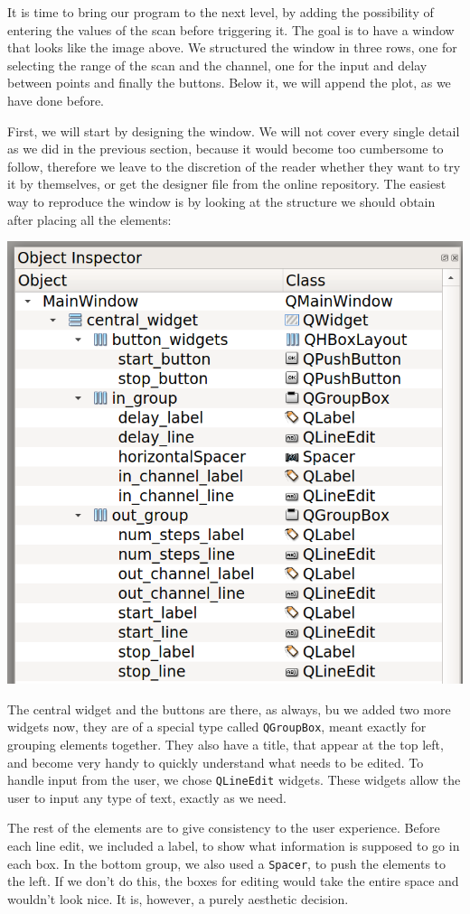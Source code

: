 It is time to bring our program to the next level, by adding the possibility of entering the values of the scan before triggering it. The goal is to have a window that looks like the image above. We structured the window in three rows, one for selecting the range of the scan and the channel, one for the input and delay between points and finally the buttons. Below it, we will append the plot, as we have done before.

First, we will start by designing the window. We will not cover every single detail as we did in the previous section, because it would become too cumbersome to follow, therefore we leave to the discretion of the reader whether they want to try it by themselves, or get the designer file from the online repository. The easiest way to reproduce the window is by looking at the structure we should obtain after placing all the elements:

\begin{center}
    \includegraphics[width=.5\textwidth]{images/Chapter_09/09_final_window_structure.png}
\end{center}

The central widget and the buttons are there, as always, bu we added two more widgets now, they are of a special type called \texttt{QGroupBox}, meant exactly for grouping elements together. They also have a title, that appear at the top left, and become very handy to quickly understand what needs to be edited. To handle input from the user, we chose \texttt{QLineEdit} widgets. These widgets allow the user to input any type of text, exactly as we need.

The rest of the elements are to give consistency to the user experience. Before each line edit, we included a label, to show what information is supposed to go in each box. In the bottom group, we also used a \texttt{Spacer}, to push the elements to the left. If we don't do this, the boxes for editing would take the entire space and wouldn't look nice. It is, however, a purely aesthetic decision.

